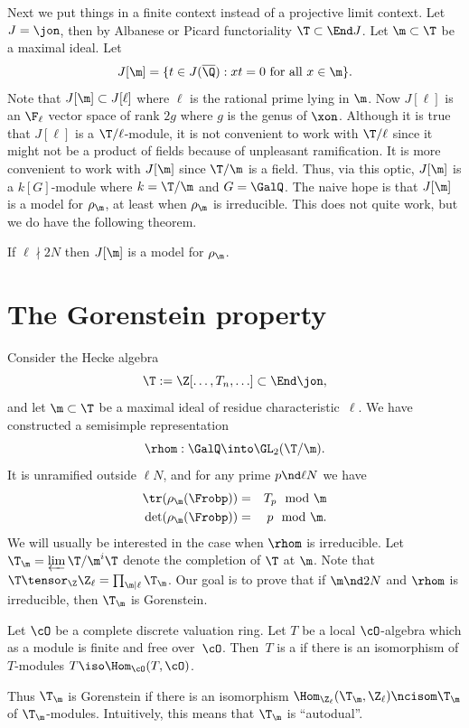 \documentclass{report}
\begin{document}
Next we put things in a finite context instead of a projective
limit context.
Let $J=\jon$, then by Albanese or Picard functoriality
$\T\subset\End J$. Let $\m\subset\T$ be a maximal ideal.
Let
$$J[\m]=\{t\in J(\overline{\Q}):xt=0 \text{ for all }x\in\m\}.$$
Note that $J[\m]\subset J[\ell]$ where $\ell$ is the rational
prime lying in $\m$. Now
$J[\ell]$ is an $\F_{\ell}$ vector space of rank $2g$ where
$g$ is the genus of $\xon$. Although it is true that
$J[\ell]$ is a $\T/\ell$-module, it is not convenient
to work with $\T/\ell$ since it might not be a product
of fields because of unpleasant ramification.
It is more convenient to work with $J[\m]$ since
$\T/\m$ is a field. Thus, via this optic,
$J[\m]$ is a $k[G]$-module where $k=\T/\m$ and
$G=\GalQ$. The naive hope is that $J[\m]$ is a model
for $\rho_\m$, at least when $\rho_\m$ is irreducible.
This does not quite work, but we do have the following theorem.
\begin{theorem}
If $\ell\nmid 2N$   then $J[\m]$ is a model for $\rho_\m$.
\end{theorem}

\section{The Gorenstein property}
Consider the Hecke algebra
$$\T:=\Z[\ldots,T_n,\ldots]\subset\End \jon,$$
and let $\m\subset\T$ be a maximal ideal of residue
characteristic~$\ell$.
We have constructed a semisimple representation
$$\rhom:\GalQ\into\GL_2(\T/\m).$$
It is unramified outside $\ell N$, and for any prime $p\nd\ell N$
we have
\begin{eqnarray*}
\tr(\rho_\m(\Frobp))&=&T_p \mod \m\\
\det(\rho_\m(\Frobp))&=&p \mod \m.
\end{eqnarray*}
We will usually be interested in the case when $\rhom$ is irreducible.
Let $\T_\m=\varprojlim \T/\m^i\T$ denote the completion of $\T$ at $\m$.
Note that
$\T\tensor_{\Z}\Z_{\ell}=\prod_{\m|\ell}\T_{\m}$.
Our goal is to prove that if $\m\nd 2N$ and $\rhom$ is irreducible,
then $\T_\m$ is Gorenstein.
\begin{defn} %
Let $\cO$ be a complete discrete valuation ring. Let $T$
be a local $\cO$-algebra which as a module is finite and
free over~$\cO$. Then~$T$ is a 
if there is an isomorphism of $T$-modules
$T\iso\Hom_{\cO}(T,\cO)$.
\end{defn}
Thus $\T_\m$ is Gorenstein if there is an isomorphism
$\Hom_{\Z_{\ell}}(\T_{\m},\Z_{\ell})\ncisom \T_{\m}$
of $\T_{\m}$-modules. Intuitively, this means
that $\T_{\m}$ is ``autodual''.
\end{document}
